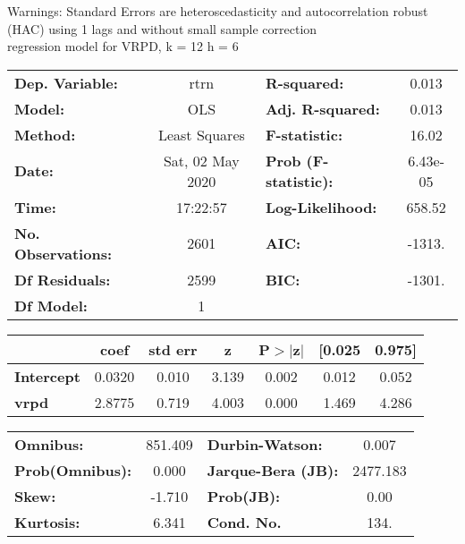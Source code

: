 Warnings: \newline
 [1] Standard Errors are heteroscedasticity and autocorrelation robust (HAC) using 1 lags and without small sample correction\\ 

regression model for VRPD, k = 12 h = 6\begin{center}
\begin{tabular}{lclc}
\toprule
\textbf{Dep. Variable:}    &       rtrn       & \textbf{  R-squared:         } &     0.013   \\
\textbf{Model:}            &       OLS        & \textbf{  Adj. R-squared:    } &     0.013   \\
\textbf{Method:}           &  Least Squares   & \textbf{  F-statistic:       } &     16.02   \\
\textbf{Date:}             & Sat, 02 May 2020 & \textbf{  Prob (F-statistic):} &  6.43e-05   \\
\textbf{Time:}             &     17:22:57     & \textbf{  Log-Likelihood:    } &    658.52   \\
\textbf{No. Observations:} &        2601      & \textbf{  AIC:               } &    -1313.   \\
\textbf{Df Residuals:}     &        2599      & \textbf{  BIC:               } &    -1301.   \\
\textbf{Df Model:}         &           1      & \textbf{                     } &             \\
\bottomrule
\end{tabular}
\begin{tabular}{lcccccc}
                   & \textbf{coef} & \textbf{std err} & \textbf{z} & \textbf{P$> |$z$|$} & \textbf{[0.025} & \textbf{0.975]}  \\
\midrule
\textbf{Intercept} &       0.0320  &        0.010     &     3.139  &         0.002        &        0.012    &        0.052     \\
\textbf{vrpd}      &       2.8775  &        0.719     &     4.003  &         0.000        &        1.469    &        4.286     \\
\bottomrule
\end{tabular}
\begin{tabular}{lclc}
\textbf{Omnibus:}       & 851.409 & \textbf{  Durbin-Watson:     } &    0.007  \\
\textbf{Prob(Omnibus):} &   0.000 & \textbf{  Jarque-Bera (JB):  } & 2477.183  \\
\textbf{Skew:}          &  -1.710 & \textbf{  Prob(JB):          } &     0.00  \\
\textbf{Kurtosis:}      &   6.341 & \textbf{  Cond. No.          } &     134.  \\
\bottomrule
\end{tabular}
\end{center}

